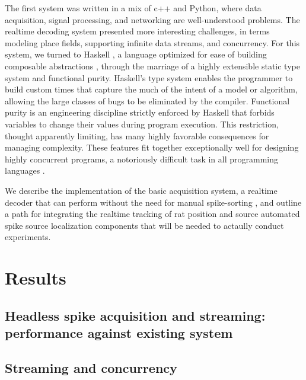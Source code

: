 \documentclass[10pt]{article}
\begin{document}
The first system was written in a mix of c++ and Python, where data acquisition, signal processing, and networking are well-understood problems. The realtime decoding system presented more interesting challenges, in terms modeling place fields, supporting infinite data streams, and concurrency. For this system, we turned to Haskell \cite{jones2003haskell}, a language optimized for ease of building composable abstractions \cite{hughes1989functional}, through the marriage of a highly extensible static type system and functional purity. Haskell's type system enables the programmer to build custom times that capture the much of the intent of a model or algorithm, allowing the large classes of bugs to be eliminated by the compiler. Functional purity is an engineering discipline strictly enforced by Haskell that forbids variables to change their values during program execution. This restriction, thought apparently limiting, has many highly favorable consequences for managing complexity. These features fit together exceptionally well for designing highly concurrent programs, a notoriously difficult task in all programming languages \cite{jones2001tackling,harris2005composable}.

We describe the implementation of the basic acquisition system, a realtime decoder that can perform without the need for manual spike-sorting \cite{kloosterman2013clusterless TODO}, and outline a path for integrating the realtime tracking of rat position and source automated spike source localization components that will be needed to actaully conduct experiments.

\section*{Results}

\subsection*{Headless spike acquisition and streaming: performance against existing system}

\subsection*{}

\subsection*{Streaming and concurrency}
\end{document}
